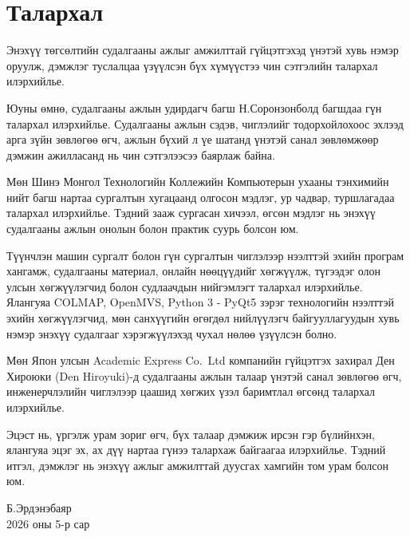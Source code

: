
\chapter*{Талархал}

Энэхүү төгсөлтийн судалгааны ажлыг амжилттай гүйцэтгэхэд үнэтэй хувь нэмэр оруулж, дэмжлэг туслалцаа үзүүлсэн бүх хүмүүстээ чин сэтгэлийн талархал илэрхийлье.

Юуны өмнө, судалгааны ажлын удирдагч багш Н.Соронзонболд багшдаа гүн талархал илэрхийлье. Судалгааны ажлын сэдэв, чиглэлийг тодорхойлохоос эхлээд арга зүйн зөвлөгөө өгч, ажлын бүхий л үе шатанд үнэтэй санал зөвлөмжөөр дэмжин ажилласанд нь чин сэтгэлээсээ баярлаж байна.

Мөн Шинэ Монгол Технологийн Коллежийн Компьютерын ухааны тэнхимийн нийт багш нартаа сургалтын хугацаанд олгосон мэдлэг, ур чадвар, туршлагадаа талархал илэрхийлье. Тэдний зааж сургасан хичээл, өгсөн мэдлэг нь энэхүү судалгааны ажлын онолын болон практик суурь болсон юм.

Түүнчлэн машин сургалт болон гүн сургалтын чиглэлээр нээлттэй эхийн програм хангамж, судалгааны материал, онлайн нөөцүүдийг хөгжүүлж, түгээдэг олон улсын хөгжүүлэгчид болон судлаачдын нийгэмлэгт талархал илэрхийлье. Ялангуяа COLMAP, OpenMVS, Python 3 - PyQt5 зэрэг технологийн нээлттэй эхийн хөгжүүлэгчид, мөн санхүүгийн өгөгдөл нийлүүлэгч байгууллагуудын хувь нэмэр энэхүү судалгааг хэрэгжүүлэхэд чухал нөлөө үзүүлсэн болно.

Мөн Япон улсын Academic Express Co.\ Ltd компанийн гүйцэтгэх захирал Ден Хироюки (Den Hiroyuki)-д судалгааны ажлын талаар үнэтэй санал зөвлөгөө өгч, инженерчлэлийн чиглэлээр цаашид хөгжих үзэл баримтлал өгсөнд талархал илэрхийлье.

Эцэст нь, үргэлж урам зориг өгч, бүх талаар дэмжиж ирсэн гэр бүлийнхэн, ялангуяа эцэг эх, ах дүү нартаа гүнээ талархаж байгаагаа илэрхийлье. Тэдний итгэл, дэмжлэг нь энэхүү ажлыг амжилттай дуусгах хамгийн том урам болсон юм.

\vspace{10mm}
\begin{flushright}
Б.Эрдэнэбаяр\\
2026 оны 5-р сар
\end{flushright}
